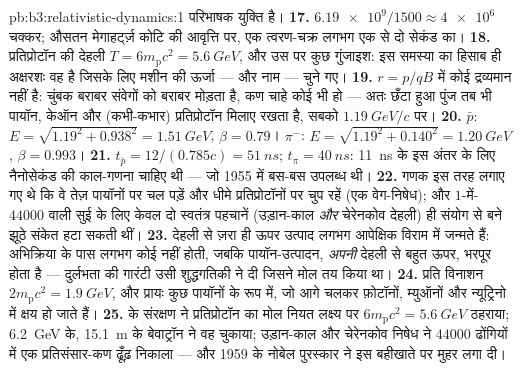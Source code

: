 \begin{solution}{pb:b3:relativistic-dynamics:1}
परिभाषक युक्ति है।
\textbf{17.} $\num{6.19e9}/1500 \approx \num{4e6}$ चक्कर; औसतन
मेगाहर्ट्ज़ कोटि की आवृत्ति पर, एक त्वरण-चक्र लगभग एक से दो सेकंड का।
\textbf{18.} प्रतिप्रोटॉन की देहली $T = 6m_{\text{p}}c^2 =
\qty{5.6}{GeV}$, और उस पर कुछ गुंजाइश: इस समस्या का हिसाब ही
अक्षरशः वह है जिसके लिए मशीन की ऊर्जा --- और नाम --- चुने गए।
\textbf{19.} $r = p/qB$ में कोई द्रव्यमान नहीं है: चुंबक बराबर संवेगों
को बराबर मोड़ता है, कण चाहे कोई भी हो --- अतः छँटा हुआ पुंज तब भी
पायॉन, केऑन और (कभी-कभार) प्रतिप्रोटॉन मिलाए रखता है, सबको
$\qty{1.19}{GeV}/c$ पर।
\textbf{20.} $\bar p$: $E = \sqrt{1.19^2 + 0.938^2} =
\qty{1.51}{GeV}$, $\beta = 0.79$। $\pi^-$: $E = \sqrt{1.19^2 +
0.140^2} = \qty{1.20}{GeV}$, $\beta = 0.993$।
\textbf{21.} $t_{\bar p} = 12/(0.785c) = \qty{51}{ns}$; $t_\pi =
\qty{40}{ns}$: \qty{11}{ns} के इस अंतर के लिए नैनोसेकंड की काल-गणना
चाहिए थी --- जो 1955 में बस-बस उपलब्ध थी।
\textbf{22.} गणक इस तरह लगाए गए थे कि वे तेज़ पायॉनों पर चल पड़ें और
धीमे प्रतिप्रोटॉनों पर चुप रहें (एक वेग-निषेध); और $1$-में-$44000$ वाली
सुई के लिए केवल दो स्वतंत्र पहचानें (उड़ान-काल \emph{और}
चेरेनकोव देहली) ही संयोग से बने झूठे संकेत हटा सकती थीं।
\textbf{23.} देहली से ज़रा ही ऊपर उत्पाद लगभग आपेक्षिक विराम में
जन्मते हैं: अभिक्रिया के पास लगभग कोई  नहीं होती, जबकि
पायॉन-उत्पादन, \emph{अपनी} देहली से बहुत ऊपर, भरपूर होता है ---
दुर्लभता की गारंटी उसी शुद्धगतिकी ने दी जिसने मोल तय किया था।
\textbf{24.} प्रति विनाशन $2m_{\text{p}}c^2 = \qty{1.9}{GeV}$, और
प्रायः कुछ पायॉनों के रूप में, जो आगे चलकर फ़ोटॉनों, म्युऑनों और
न्यूट्रिनो में क्षय हो जाते हैं।
\textbf{25.}  के संरक्षण ने प्रतिप्रोटॉन का मोल नियत लक्ष्य पर
$6m_{\text{p}}c^2 = \qty{5.6}{GeV}$ ठहराया; \qty{6.2}{GeV} के,
\qty{15.1}{m} के बेवाट्रॉन ने वह चुकाया; उड़ान-काल और
चेरेनकोव निषेध ने $44000$ ढोंगियों में एक प्रतिसंसार-कण ढूँढ़ निकाला
--- और 1959 के नोबेल पुरस्कार ने इस बहीखाते पर मुहर लगा दी।
\end{solution}
